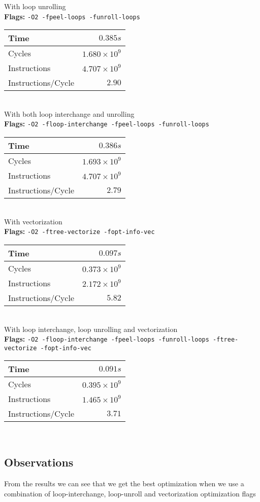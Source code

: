 \documentclass[12pt, letterpaper]{article}
\begin{document}
With loop unrolling\\
\textbf{Flags:} \verb~-O2 -fpeel-loops -funroll-loops~\\
\begin{tabular}{|l|r|}
  \hline
  Time& $0.385s$\\
  \hline
  Cycles& $1.680 \times 10^9$\\
  \hline
  Instructions& $4.707 \times 10^9$\\
  \hline
  Instructions/Cycle & $2.90$\\
  \hline
\end{tabular}\\

With both loop interchange and unrolling\\
\textbf{Flags:} \verb~-O2 -floop-interchange -fpeel-loops -funroll-loops~\\
\begin{tabular}{|l|r|}
  \hline
  Time& $0.386s$\\
  \hline
  Cycles& $1.693 \times 10^9$\\
  \hline
  Instructions& $4.707 \times 10^9$\\
  \hline
  Instructions/Cycle & $2.79$\\
  \hline
\end{tabular}\\

With vectorization\\
\textbf{Flags:} \verb~-O2 -ftree-vectorize -fopt-info-vec~\\
\begin{tabular}{|l|r|}
  \hline
  Time& $0.097s$\\
  \hline
  Cycles& $0.373 \times 10^9$\\
  \hline
  Instructions& $2.172 \times 10^9$\\
  \hline
  Instructions/Cycle & $5.82$\\
  \hline
\end{tabular}\\

With loop interchange, loop unrolling and vectorization\\
\textbf{Flags:} \verb~-O2 -floop-interchange -fpeel-loops -funroll-loops -ftree-vectorize -fopt-info-vec~\\
\begin{tabular}{|l|r|}
  \hline
  Time& $0.091s$\\
  \hline
  Cycles& $0.395 \times 10^9$\\
  \hline
  Instructions& $1.465 \times 10^9$\\
  \hline
  Instructions/Cycle & $3.71$\\
  \hline
\end{tabular}\\

\subsection{Observations}
\label{sec:obs}

From the results we can see that we get the best optimization when we use a combination of loop-interchange, loop-unroll and vectorization optimization flags
\end{document}
